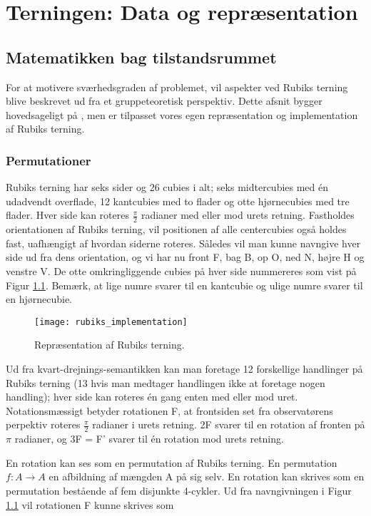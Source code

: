 \documentclass[../main.tex]{subfiles}
\begin{document}
\chapter{Terningen: Data og repræsentation}
\section{Matematikken bag tilstandsrummet}\label{sec:grouptheory}
For at motivere sværhedsgraden af problemet, vil aspekter ved Rubiks terning blive beskrevet ud fra et gruppeteoretisk perspektiv. Dette afsnit bygger hovedsageligt på \cite{GroupTheory}, men er tilpasset vores egen repræsentation og implementation af Rubiks terning. 
\subsection{Permutationer}

Rubiks terning har seks sider og 26 cubies i alt; seks midtercubies med én udadvendt overflade, 12 kantcubies med to flader og otte hjørnecubies med tre flader. Hver side kan roteres $\frac{\pi}{2}$ radianer med eller mod urets retning. Fastholdes orientationen af Rubiks terning, vil positionen af alle centercubies også holdes fast, uafhængigt af hvordan siderne roteres. Således vil man kunne navngive hver side ud fra dens orientation, og vi har nu front F, bag B, op O, ned N, højre H og venstre V. De otte omkringliggende cubies på hver side nummereres som vist på Figur \ref{RubiksImplementation}. Bemærk, at lige numre svarer til en kantcubie og ulige numre svarer til en hjørnecubie.

\begin{figure}[H]
	\centering 
	\texttt{[image: rubiks\_implementation]}
	\caption{Repræsentation af Rubiks terning.}
	\label{RubiksImplementation}
\end{figure}

Ud fra kvart-drejnings-semantikken kan man foretage 12 forskellige handlinger på Rubiks terning (13 hvis man medtager handlingen ikke at foretage nogen handling); hver side kan roteres én gang enten med eller mod uret. Notationsmæssigt betyder rotationen F, at frontsiden set fra observatørens perpektiv roteres $\frac{\pi}{2}$ radianer i urets retning. 2F svarer til en rotation af fronten på $\pi$ radianer, og 3F = F' svarer til én rotation mod urets retning. 

En rotation kan ses som en permutation af Rubiks terning. En permutation $f:A\rightarrow A$ en afbildning af mængden A på sig selv. En rotation kan skrives som en permutation bestående af fem disjunkte 4-cykler. Ud fra navngivningen i Figur \ref{RubiksImplementation} vil rotationen F kunne skrives som
\end{document}
